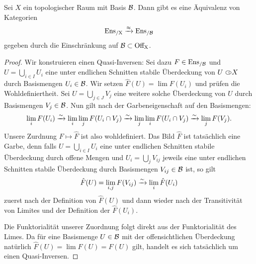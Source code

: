 \begin{satz}
  Sei $X$ ein topologischer Raum mit Basis $\mathcal{B}$. Dann gibt es eine
  Äquivalenz von Kategorien
  \[ \operatorname{Ens_{/X}} \xrightarrow{\approx} \operatorname{Ens_{/\mathcal{B}}} \]
  gegeben durch die Einschränkung auf $\mathcal{B} \subset \operatorname{Off_X}$.
\end{satz}
\begin{proof}
  Wir konstruieren einen Quasi-Inversen: Sei dazu $F \in \operatorname{Ens_{/\mathcal{B}}}$ und $U
  = \bigcup_{i \in I} U_i$ eine unter endlichen Schnitten stabile
  Überdeckung von $U \subset\kern-0.58em\circ X$ durch Basismengen $U_i \in \mathcal{B}$. Wir
  setzen $\hat{F}(U) = \lim F(U_i)$ und prüfen die
  Wohldefiniertheit. Sei $U = \bigcup_{j \in J} V_j$ eine weitere
  solche Überdeckung von $U$ durch Basismengen $V_j \in \mathcal{B}$. Nun gilt
  nach der Garbeneigenschaft auf den Basismengen:
  \[ \lim_i F(U_i)
  \xrightarrow[]{\sim} \lim_i \lim_j F(U_i \cap V_j)
  \xrightarrow[]{\sim} \lim_j \lim_i F(U_i \cap V_j)
  \xrightarrow[]{\sim} \lim_j F(V_j) .\]
  Unsere Zurdnung $F \mapsto \hat{F}$ ist also wohldefiniert. Das Bild
  $\hat{F}$ ist tatsächlich eine Garbe, denn falls $U = \bigcup_{i \in
    I} U_i$ eine unter endlichen Schnitten stabile Überdeckung durch
  offene Mengen und $U_i = \bigcup_{j} V_{ij}$ jeweils eine unter endlichen
  Schnitten stabile Überdeckung durch Basismengen $V_{ij} \in \mathcal{B}$ ist,
  so gilt
  \[ \hat{F}(U) = \lim_{i,j} F(V_{ij}) \xrightarrow[]{\sim} \lim_i \hat{F}(U_i) \]
  zuerst nach der Definition von $\hat{F}(U)$ und dann wieder nach der
  Transitivität von Limites und der Definition der $\hat{F}(U_i)$.
  
  Die Funktorialität unserer Zuordnung folgt direkt aus der
  Funktorialität des Limes. Da für eine Basismenge $U \in \mathcal{B}$ mit der
  offensichtlichen Überdeckung natürlich $\hat{F}(U) = \lim F(U) =
  F(U) $ gilt, handelt es sich tatsächlich um einen Quasi-Inversen.
\end{proof}

